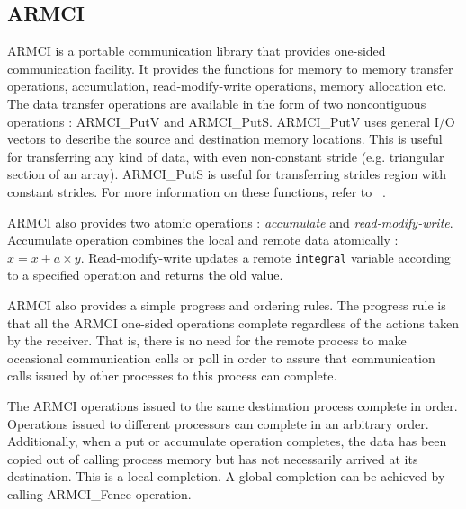 \subsection{ARMCI}

ARMCI is a portable communication library that provides one-sided communication facility. It provides the functions for
memory to memory transfer operations, accumulation, read-modify-write operations, memory allocation etc. 
The data transfer operations are available in the form of two noncontiguous operations : ARMCI\_PutV and ARMCI\_PutS.
ARMCI\_PutV uses general I/O vectors to describe the source and destination memory locations. This is useful
for transferring any kind of data, with even non-constant stride (e.g. triangular section of an array).
ARMCI\_PutS is useful for transferring strides region with constant strides. For more information on these
functions, refer to ~\cite{armci}.

ARMCI also provides two atomic operations : {\em accumulate} and {\em read-modify-write}. Accumulate operation
combines the local and remote data atomically : {\tt $x = x + a \times y$}. Read-modify-write updates a
remote {\tt integral} variable according to a specified operation and returns the old value.

ARMCI also provides a simple progress and ordering rules. The progress rule is
that all the ARMCI one-sided operations complete regardless of
the actions taken by the receiver. That is, there is no need for the remote
process to make occasional communication calls or poll in order to assure
that communication calls issued by other processes to this process can
complete. 

The ARMCI operations issued to the same destination process complete
in order. Operations issued to different processors can complete in an
arbitrary order. Additionally, when a  put or accumulate operation completes,
the data has been copied out of calling process memory but has not 
necessarily arrived at its destination. This is a local completion. A global
completion can be achieved by calling ARMCI\_Fence operation. 